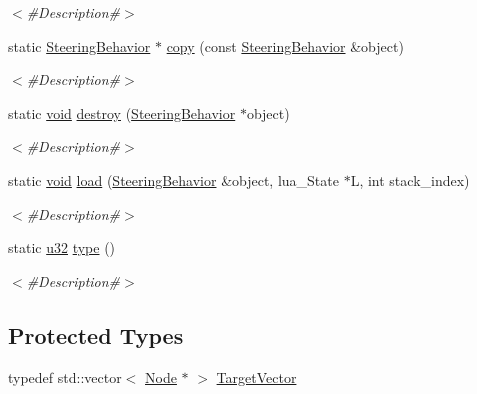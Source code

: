 \begin{DoxyCompactItemize}
\begin{DoxyCompactList}\small\item\em $<$\#\+Description\#$>$ \end{DoxyCompactList}\item 
static \mbox{\hyperlink{classnjli_1_1_steering_behavior}{Steering\+Behavior}} $\ast$ \mbox{\hyperlink{classnjli_1_1_steering_behavior_a7a24f6e560057d1609da98ac353561b6}{copy}} (const \mbox{\hyperlink{classnjli_1_1_steering_behavior}{Steering\+Behavior}} \&object)
\begin{DoxyCompactList}\small\item\em $<$\#\+Description\#$>$ \end{DoxyCompactList}\item 
static \mbox{\hyperlink{_thread_8h_af1e856da2e658414cb2456cb6f7ebc66}{void}} \mbox{\hyperlink{classnjli_1_1_steering_behavior_ad1867854ab502ef50adba56ea4da1d84}{destroy}} (\mbox{\hyperlink{classnjli_1_1_steering_behavior}{Steering\+Behavior}} $\ast$object)
\begin{DoxyCompactList}\small\item\em $<$\#\+Description\#$>$ \end{DoxyCompactList}\item 
static \mbox{\hyperlink{_thread_8h_af1e856da2e658414cb2456cb6f7ebc66}{void}} \mbox{\hyperlink{classnjli_1_1_steering_behavior_a1d492f79b5486b45cf52b4c0e25a9f97}{load}} (\mbox{\hyperlink{classnjli_1_1_steering_behavior}{Steering\+Behavior}} \&object, lua\+\_\+\+State $\ast$L, int stack\+\_\+index)
\begin{DoxyCompactList}\small\item\em $<$\#\+Description\#$>$ \end{DoxyCompactList}\item 
static \mbox{\hyperlink{_util_8h_a10e94b422ef0c20dcdec20d31a1f5049}{u32}} \mbox{\hyperlink{classnjli_1_1_steering_behavior_a3c8ce7cce8fa14d182d917d3ee4d9b13}{type}} ()
\begin{DoxyCompactList}\small\item\em $<$\#\+Description\#$>$ \end{DoxyCompactList}\end{DoxyCompactItemize}
\subsection*{Protected Types}
\begin{DoxyCompactItemize}
\item 
typedef std\+::vector$<$ \mbox{\hyperlink{classnjli_1_1_node}{Node}} $\ast$ $>$ \mbox{\hyperlink{classnjli_1_1_steering_behavior_ab7a7224d97d2e392e5ae75108a6c160a}{Target\+Vector}}
\end{DoxyCompactItemize}
